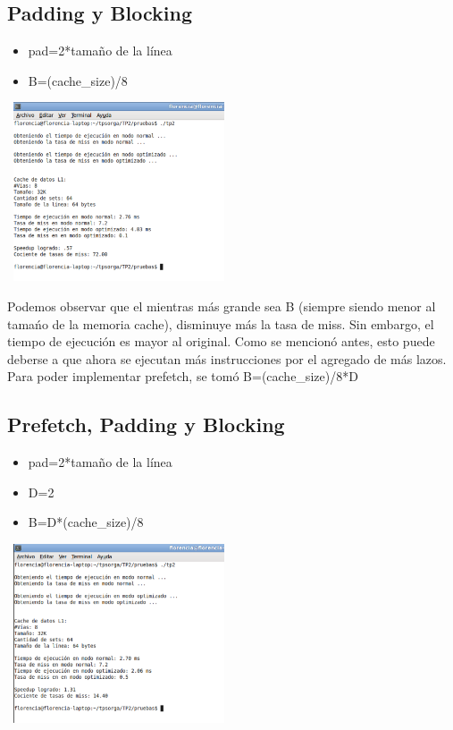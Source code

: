 \documentclass[a4paper,10pt]{article}
\begin{document}
\subsection*{Padding y Blocking}
\begin{itemize}
\item pad=2*tama\~no de la l\'inea
\item B=(cache\_size)/8
\end{itemize}
\begin{center}
 \includegraphics[width=250px,height=200px,bb=0 0 328 277,scale=1]{./ssh6.png}
\end{center}


Podemos observar que el mientras m\'as grande sea B (siempre siendo menor al tama\'no de la memoria cache), disminuye m\'as la tasa de miss.
Sin embargo, el tiempo de ejecuci\'on es mayor al original. Como se mencion\'o antes, esto puede deberse a que ahora se ejecutan m\'as instrucciones
por el agregado de m\'as lazos.
Para poder implementar prefetch, se tom\'o B=(cache\_size)/8*D\\

\subsection*{Prefetch, Padding y Blocking}
\begin{itemize}
\item pad=2*tama\~no de la l\'inea
\item D=2
\item B=D*(cache\_size)/8
\end{itemize}

\begin{center}
 \includegraphics[width=250px,height=200px,bb=0 0 328 277,scale=1]{./ssh7.png}
\end{center}
\end{document}
